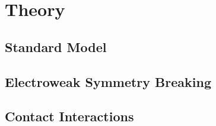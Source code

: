 \chapter{Theory}

\section{Standard Model}
\section{Electroweak Symmetry Breaking}
\section{Contact Interactions}
